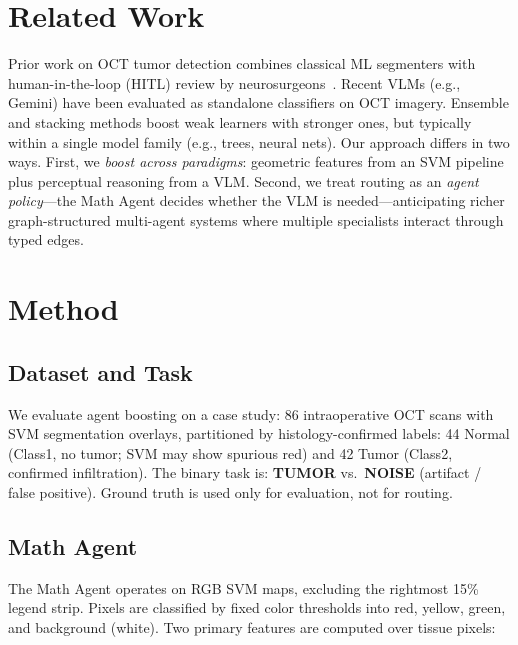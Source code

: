\documentclass[11pt]{article}
\begin{document}
\section{Related Work}

Prior work on OCT tumor detection combines classical ML segmenters with human-in-the-loop (HITL) review by neurosurgeons~\cite{mdpi2024}.
Recent VLMs (e.g., Gemini) have been evaluated as standalone classifiers on OCT imagery.
Ensemble and stacking methods boost weak learners with stronger ones, but typically within a single model family (e.g., trees, neural nets).
Our approach differs in two ways.
First, we \emph{boost across paradigms}: geometric features from an SVM pipeline plus perceptual reasoning from a VLM.
Second, we treat routing as an \emph{agent policy}---the Math Agent decides whether the VLM is needed---anticipating richer graph-structured multi-agent systems where multiple specialists interact through typed edges.

\section{Method}

\subsection{Dataset and Task}

We evaluate agent boosting on a case study: 86 intraoperative OCT scans with SVM segmentation overlays, partitioned by histology-confirmed labels:
44 Normal (Class1, no tumor; SVM may show spurious red) and 42 Tumor (Class2, confirmed infiltration).
The binary task is: \textbf{TUMOR} vs.\ \textbf{NOISE} (artifact / false positive).
Ground truth is used only for evaluation, not for routing.

\subsection{Math Agent}

The Math Agent operates on RGB SVM maps, excluding the rightmost 15\% legend strip.
Pixels are classified by fixed color thresholds into red, yellow, green, and background (white).
Two primary features are computed over tissue pixels:
\end{document}
